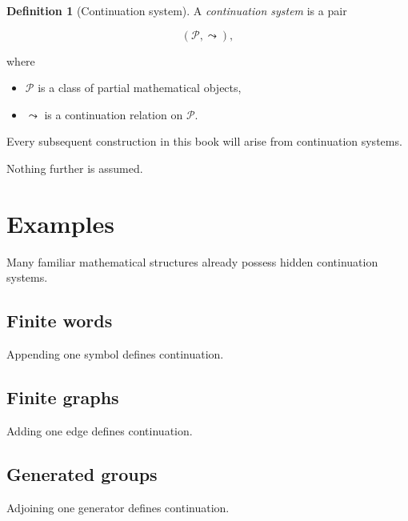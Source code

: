 \documentclass[13pt,openany]{book}
\theoremstyle{plain}
\theoremstyle{definition}
\newtheorem{definition}{Definition}[chapter]
\begin{document}
\begin{definition}[Continuation system]
A \emph{continuation system} is a pair

\[
(\mathcal P,\leadsto),
\]

where

\begin{itemize}
\item \(\mathcal P\) is a class of partial mathematical objects,

\item \(\leadsto\) is a continuation relation on \(\mathcal P\).
\end{itemize}
\end{definition}

Every subsequent construction in this book will arise from continuation
systems.

Nothing further is assumed.

\section{Examples}

Many familiar mathematical structures already possess hidden continuation
systems.

\subsection*{Finite words}

Appending one symbol defines continuation.

\vspace{0.5em}

\subsection*{Finite graphs}

Adding one edge defines continuation.

\vspace{0.5em}

\subsection*{Generated groups}

Adjoining one generator defines continuation.

\vspace{0.5em}
\end{document}

